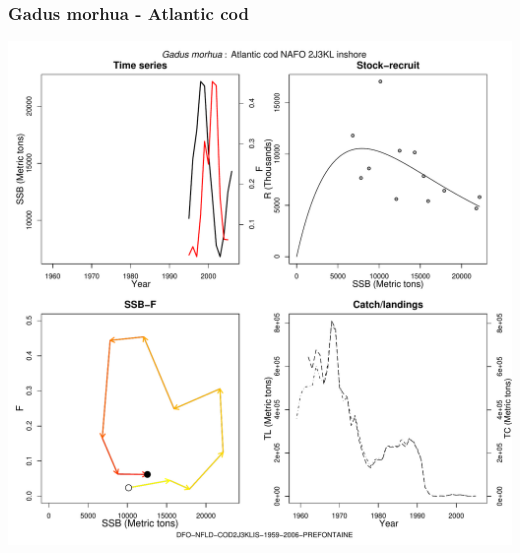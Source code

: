 \subsubsection{Gadus morhua - Atlantic cod}
\begin{center}
\includegraphics[width=1.2\textwidth]{../R/figures/DFO-NFLD-COD2J3KLIS-1959-2006-PREFONTAINE.pdf}
\end{center}

